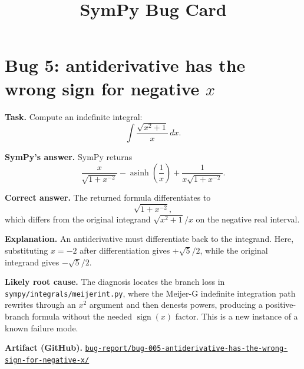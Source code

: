 \documentclass[11pt]{article}
\title{SymPy Bug Card}
\author{}
\date{}
\newcommand{\SymPy}{SymPy}
\newcommand{\artifactrepo}{https://github.com/TODO-org/TODO-repo}
\newcommand{\bugbundle}[1]{\href{\artifactrepo/tree/main/bug-report/#1}{\nolinkurl{bug-report/#1/}}}
\begin{document}
\maketitle

\section*{Bug 5: antiderivative has the wrong sign for negative \(x\)}

\begin{counterexamplebox}
\textbf{Task.} Compute an indefinite integral:
\[
\int \frac{\sqrt{x^2+1}}{x}\,dx .
\]

\medskip
\textbf{SymPy's answer.} \SymPy{} returns
\[
\frac{x}{\sqrt{1+x^{-2}}}
-\operatorname{asinh}\!\left(\frac{1}{x}\right)
+\frac{1}{x\sqrt{1+x^{-2}}}.
\]

\medskip
\textbf{Correct answer.} The returned formula differentiates to
\[
\sqrt{1+x^{-2}},
\]
which differs from the original integrand \(\sqrt{x^2+1}/x\) on the negative
real interval.

\medskip
\textbf{Explanation.} An antiderivative must differentiate back to the
integrand. Here, substituting \(x=-2\) after differentiation gives
\(+\sqrt{5}/2\), while the original integrand gives \(-\sqrt{5}/2\).

\medskip
\textbf{Likely root cause.} The diagnosis locates the branch loss in
\nolinkurl{sympy/integrals/meijerint.py}, where the Meijer-G indefinite
integration path rewrites through an \(x^2\) argument and then denests powers,
producing a positive-branch formula without the needed \(\operatorname{sign}(x)\)
factor. This is a new instance of a known failure mode.

\medskip
\textbf{Artifact (GitHub).} \bugbundle{bug-005-antiderivative-has-the-wrong-sign-for-negative-x}
\end{counterexamplebox}
\end{document}
